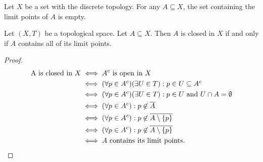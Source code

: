 \begin{example}
    Let $X$ be a set with the discrete topology. For any $A \subseteq X$, the set containing the limit points of $A$ is empty.
\end{example}

\begin{proposition}\label{prop:closed-iff-contains-lim-pts}
    Let $(X,T)$ be a topological space. Let $A \subseteq X$. Then $A$ is closed in $X$ if and only if $A$ contains all of its limit points.
\end{proposition}
    \begin{proof}
        \begin{equation*}
        \begin{split}
            \text{A is closed in $X$}
            &\iff \text{$A^c$ is open in $X$} \\
            &\iff \text{$(\forall p \in A^c)(\exists U \in T):p \in U \subseteq A^c$} \\
            &\iff \text{$(\forall p \in A^c)(\exists U \in T):p \in U $ and $ U \cap A= \emptyset$} \\
            &\iff \text{$(\forall p \in A^c):p \not\in \overline{A}$} \\
            &\iff \text{$(\forall p \in A^c):p \not\in \overline{A \setminus \{p\}}$} \\
            &\iff \text{$(\forall p \in A^c):p \not\in \overline{A \setminus \{p\}}$} \\
            &\iff \text{$A$ contains its limit points.} \\
        \end{split}
        \end{equation*}
    \end{proof}


